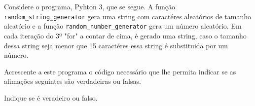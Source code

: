 \documentclass[12pt,varwidth=16cm,border=1pt]{standalone}
\begin{document}
Considere o programa, Pyhton 3, que se segue. A função \verb+random_string_generator+ gera uma string com caractéres aleatórios de tamanho aleatório e a função \verb+random_number_generator+ gera um número aleatório. Em cada iteração do 3º "for" a contar de cima, é gerado uma string, caso o tamanho dessa string seja menor que 15 caractéres essa string é substituida por um número.



Acrescente a este programa o código necessário que lhe permita indicar se as
afimações seguintes são verdadeiras ou falsas.

Indique se é veradeiro ou falso.
\end{document}
